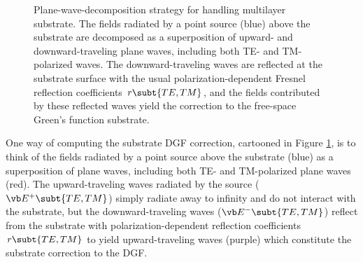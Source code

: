\documentclass[letterpaper]{article}
\begin{document}
\begin{figure}
\begin{center}
\caption{Plane-wave-decomposition strategy for handling 
multilayer substrate. The fields radiated by a point source (blue)
above the substrate are decomposed as a superposition of
upward- and downward-traveling plane waves, including 
both TE- and TM-polarized waves. The downward-traveling waves
are reflected at the substrate surface with the usual
polarization-dependent Fresnel reflection coefficients $r\subt{TE,TM}$,
and the fields contributed by these reflected waves
yield the correction to the free-space Green's function
substrate.
}
\label{PlaneWaveFigure}
\end{center}
\end{figure}

One way of computing the substrate DGF 
correction, cartooned in Figure \ref{PlaneWaveFigure}, is
to think of the fields radiated by a point source above
the substrate (blue) as a superposition of 
plane waves, including both TE- and TM-polarized
plane waves (red). The upward-traveling waves radiated by the 
source ($\vb E^+\subt{TE,TM}$) simply radiate away to 
infinity and do not interact with the substrate, but the
downward-traveling waves
($\vb E^-\subt{TE,TM}$) reflect from the substrate 
with polarization-dependent reflection coefficients
$r\subt{TE,TM}$ to yield upward-traveling waves (purple)
which constitute the substrate correction to the DGF.
\end{document}

